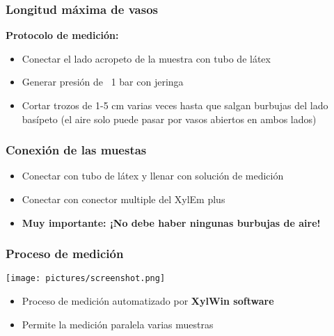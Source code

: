 \documentclass[usepdftitle=false]{beamer}
\newcommand{\tw}{\textwidth}
\begin{document}
\begin{frame}	
	\frametitle{Longitud máxima de vasos}
	\begin{minipage}{.5\tw}
		\textbf{Protocolo de medición:}
		\begin{itemize}
			\item<1- |alert@1> Conectar el lado acropeto de la muestra con tubo de látex
			\item<2- |alert@2> Generar presión de ~1 bar con jeringa
			\item<3- |alert@3> Cortar trozos de 1-5 cm varias veces hasta que salgan burbujas del lado basípeto (el aire solo puede pasar por vasos abiertos en ambos lados)				
		\end{itemize}	    
	\end{minipage}
	\begin{minipage}{0.48\tw}		
		
	
	\end{minipage}			
\end{frame}

\begin{frame}
	\frametitle{Conexión de las muestas}
	\begin{minipage}{.68\tw}
		\begin{itemize}
			\item<1- |alert@1> Conectar con tubo de látex y llenar con solución de medición
			\item<2- |alert@2> Conectar con conector multiple del XylEm plus
			\item<3- |alert@3> \textbf{Muy importante: ¡No debe haber ningunas burbujas de aire!}
	    \end{itemize}	    	
	\end{minipage}
	\begin{minipage}{0.3\tw}
		
		
	\end{minipage}	
\end{frame}

\begin{frame}
	\frametitle{Proceso de medición} 
	\texttt{[image: pictures/screenshot.png]}
	\begin{itemize}[<+-| alert@+>]
		\item Proceso de medición automatizado por \textbf{XylWin software}
		\item Permite la medición paralela varias muestras 
	\end{itemize}	
\end{frame}
\end{document}
